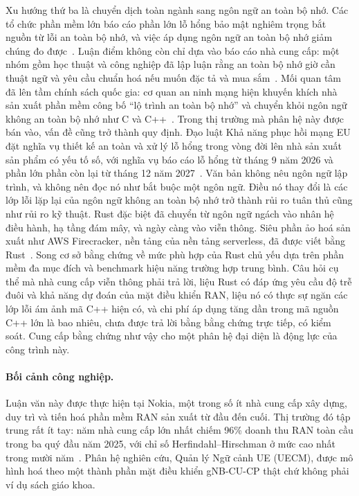 Xu hướng thứ ba là chuyển dịch toàn ngành sang ngôn ngữ an toàn bộ nhớ. Các tổ chức phần mềm
lớn báo cáo phần lớn lỗ hổng bảo mật nghiêm trọng bắt nguồn từ lỗi an toàn bộ nhớ, và việc
áp dụng ngôn ngữ an toàn bộ nhớ giảm chúng đo
được~\cite{msrc2019memory,google2022android,vanderstoep2025android,google2024securebydesign}.
Luận điểm không còn chỉ dựa vào báo cáo nhà cung cấp: một nhóm gồm học thuật và công nghiệp
đã lập luận rằng an toàn bộ nhớ giờ cần thuật ngữ và yêu cầu chuẩn hoá nếu muốn đặc tả và
mua sắm~\cite{watson2025memorysafety}. Mối quan tâm đã lên tầm chính sách quốc gia: cơ quan
an ninh mạng hiện khuyến khích nhà sản xuất phần mềm công bố ``lộ trình an toàn bộ nhớ'' và
chuyển khỏi ngôn ngữ không an toàn bộ nhớ như C và
C++~\cite{cisa2023memorysafe,oncd2024building}. Trong thị trường mà phân hệ này được bán
vào, vấn đề cũng trở thành quy định. Đạo luật Khả năng phục hồi mạng EU đặt nghĩa vụ thiết kế
an toàn và xử lý lỗ hổng trong vòng đời lên nhà sản xuất sản phẩm có yếu tố số, với nghĩa vụ
báo cáo lỗ hổng từ tháng 9 năm 2026 và phần lớn phần còn lại từ tháng 12 năm
2027~\cite{eu2024cra}. Văn bản không nêu ngôn ngữ lập trình, và không nên đọc nó như bắt buộc
một ngôn ngữ. Điều nó thay đổi là các lớp lỗi lặp lại của ngôn ngữ không an toàn bộ nhớ trở
thành rủi ro tuân thủ cũng như rủi ro kỹ thuật. Rust đặc biệt đã chuyển từ ngôn ngữ ngách
vào nhân hệ điều hành, hạ tầng đám mây, và ngày càng vào viễn thông. Siêu phần ảo hoá sản
xuất như AWS Firecracker, nền tảng của nền tảng serverless, đã được viết bằng
Rust~\cite{agache2020firecracker}. Song cơ sở bằng chứng về mức phù hợp của Rust chủ yếu dựa
trên phần mềm đa mục đích và benchmark hiệu năng trường hợp trung bình. Câu hỏi cụ thể mà
nhà cung cấp viễn thông phải trả lời, liệu Rust có đáp ứng yêu cầu độ trễ đuôi và khả năng
dự đoán của mặt điều khiển RAN, liệu nó có thực sự ngăn các lớp lỗi ám ảnh mã C++ hiện có,
và chi phí áp dụng tăng dần trong mã nguồn C++ lớn là bao nhiêu, chưa được trả lời bằng
bằng chứng trực tiếp, có kiểm soát. Cung cấp bằng chứng như vậy cho một phân hệ đại diện là
động lực của công trình này.

\paragraph{Bối cảnh công nghiệp.}
Luận văn này được thực hiện tại Nokia, một trong số ít nhà cung cấp xây dựng, duy trì và tiến
hoá phần mềm RAN sản xuất từ đầu đến cuối. Thị trường đó tập trung rất ít tay: năm nhà cung
cấp lớn nhất chiếm 96\% doanh thu RAN toàn cầu trong ba quý đầu năm 2025, với chỉ số
Herfindahl--Hirschman ở mức cao nhất trong mười
năm~\cite{delloro2025ran3q,delloro2026ran}. Phân hệ nghiên cứu, Quản lý Ngữ cảnh UE (UECM),
được mô hình hoá theo một thành phần mặt điều khiển gNB-CU-CP thật chứ không phải ví dụ sách
giáo khoa.

